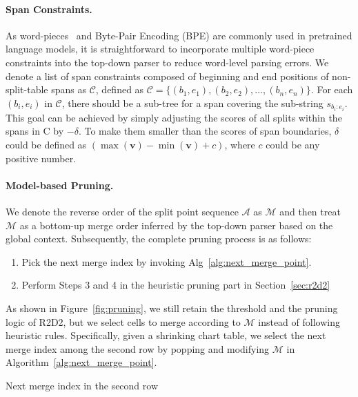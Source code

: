 \paragraph{Span Constraints.}
As word-pieces~\cite{wu2016google} and Byte-Pair Encoding (BPE) are commonly used in pretrained language models,
it is straightforward to incorporate multiple word-piece constraints into the top-down parser to reduce word-level parsing errors.
We denote a list of span constraints composed of beginning and end positions of non-split-table spans as $\mathcal{C}$, defined as $\mathcal{C}=\{(b_{1}, e_{1}), (b_{2}, e_{2}), ..., (b_{n}, e_{n})\}$. 
For each $(b_{i}, e_{i})$ in $\mathcal{C}$, there should be a sub-tree for a span covering the sub-string $s_{b_{i}:e_{i}}$. 
This goal can be achieved by simply adjusting the scores of all splits within the spans in C by $-\delta$. To make them smaller than the scores of span boundaries, $\delta$ could be defined as $(\max(\textbf{v}) - \min(\textbf{v}) + c)$, where $c$ could be any positive number.

\paragraph{Model-based Pruning.}
We denote the reverse order of the split point sequence $\mathcal{A}$ as $\mathcal{M}$ and
then treat $\mathcal{M}$ as a bottom-up merge order inferred by the top-down parser based on the global context.
Subsequently, the complete pruning process is as follows: 
\begin{enumerate}
\item Pick the next merge index by invoking Alg~\ref{alg:next_merge_point}. 
\item Perform Steps 3 and 4 in the heuristic pruning part in Section~\ref{sec:r2d2}
\end{enumerate}
As shown in Figure~\ref{fig:pruning}, we still retain the threshold and the pruning logic of R2D2, 
but we select cells to merge according to $\mathcal{M}$ instead of following heuristic rules. 
Specifically, given a shrinking chart table, 
we select the next merge index among the second row by popping and modifying $\mathcal{M}$ in Algorithm~\ref{alg:next_merge_point}.

\begin{algorithm}[!h]
\small
    \caption{Next merge index in the second row}
    \label{alg:next_merge_point}
    \begin{algorithmic}[1] %
         
         
        \EndIf
        \EndFor
        \EndFunction
    \end{algorithmic}
\end{algorithm}

